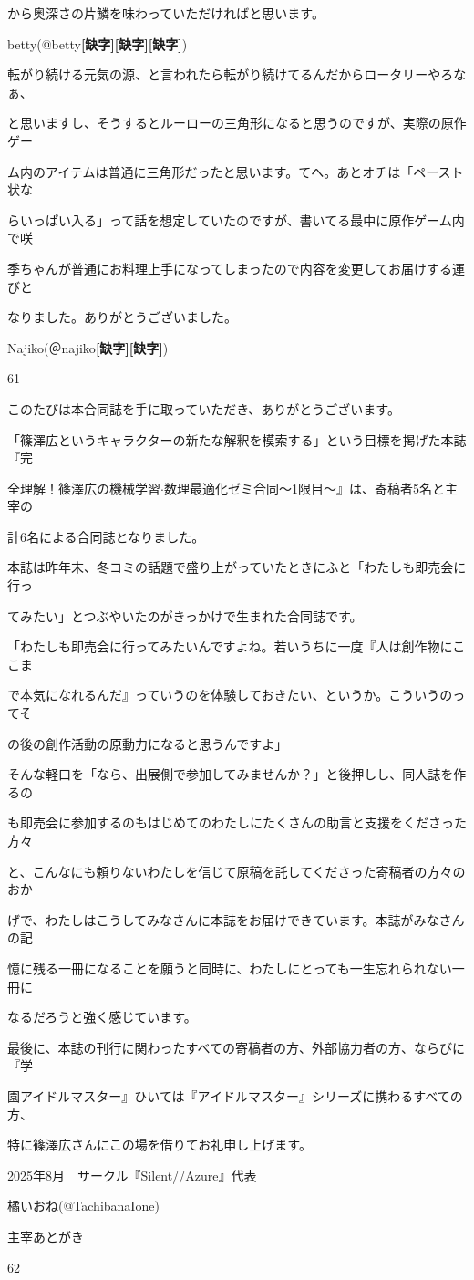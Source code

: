 から奥深さの片鱗を味わっていただければと思います。\par
betty(@betty\textbf{[缺字]}\textbf{[缺字]}\textbf{[缺字]})\par
転がり続ける元気の源、と言われたら転がり続けてるんだからロータリーやろなぁ、\par
と思いますし、そうするとルーローの三角形になると思うのですが、実際の原作ゲー\par
ム内のアイテムは普通に三角形だったと思います。てへ。あとオチは「ペースト状な\par
らいっぱい入る」って話を想定していたのですが、書いてる最中に原作ゲーム内で咲\par
季ちゃんが普通にお料理上手になってしまったので内容を変更してお届けする運びと\par
なりました。ありがとうございました。\par
Najiko(＠najiko\textbf{[缺字]}\textbf{[缺字]})\par
61\par

このたびは本合同誌を手に取っていただき、ありがとうございます。\par
「篠澤広というキャラクターの新たな解釈を模索する」という目標を掲げた本誌『完\par
全理解！篠澤広の機械学習$\cdot$数理最適化ゼミ合同～1限目～』は、寄稿者5名と主宰の\par
計6名による合同誌となりました。\par
本誌は昨年末、冬コミの話題で盛り上がっていたときにふと「わたしも即売会に行っ\par
てみたい」とつぶやいたのがきっかけで生まれた合同誌です。\par
「わたしも即売会に行ってみたいんですよね。若いうちに一度『人は創作物にここま\par
で本気になれるんだ』っていうのを体験しておきたい、というか。こういうのってそ\par
の後の創作活動の原動力になると思うんですよ」\par
そんな軽口を「なら、出展側で参加してみませんか？」と後押しし、同人誌を作るの\par
も即売会に参加するのもはじめてのわたしにたくさんの助言と支援をくださった方々\par
と、こんなにも頼りないわたしを信じて原稿を託してくださった寄稿者の方々のおか\par
げで、わたしはこうしてみなさんに本誌をお届けできています。本誌がみなさんの記\par
憶に残る一冊になることを願うと同時に、わたしにとっても一生忘れられない一冊に\par
なるだろうと強く感じています。\par
最後に、本誌の刊行に関わったすべての寄稿者の方、外部協力者の方、ならびに『学\par
園アイドルマスター』ひいては『アイドルマスター』シリーズに携わるすべての方、\par
特に篠澤広さんにこの場を借りてお礼申し上げます。\par
2025年8月　サークル『Silent//Azure』代表\par
橘いおね(@TachibanaIone)\par
主宰あとがき\par
62\par

